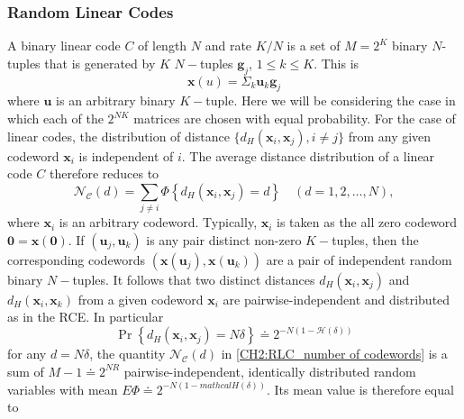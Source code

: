 \subsubsection{Random Linear Codes}
A binary linear code $C$ of length $N$ and rate $K/N$ is a set of $M=2^K$ binary $N$-tuples that is generated by $K$ $N-$tuples $\mathbf{g}_j$, $1\leq k \leq K$. This is
\begin{equation}
\mathbf{x}(u)=\Sigma_k \mathbf{u}_k \mathbf{g}_j
\end{equation}
where $\mathbf{u}$ is an arbitrary binary $K-$tuple. Here we will be considering the case in which each of the $2^{NK}$ matrices are chosen with equal probability. For the case of linear codes, the distribution of distance $\{d_H(\mathbf{x}_i,\mathbf{x}_j),i\neq j\}$ from any given codeword $\mathbf{x}_i$ is independent of $i$. The average distance distribution of a linear code $C$ therefore reduces to
\begin{equation}
\mathcal{N}_{\mathcal{C}}(d)=\sum_{j \neq i} \Phi\left\{d_{H}\left(\boldsymbol{x}_{i}, \boldsymbol{x}_{j}\right)=d\right\} \quad(d=1,2, \ldots, N),
\label{CH2:RLC_number of codewords}
\end{equation}
where $\mathbf{x}_i$ is an arbitrary codeword. Typically, $\mathbf{x}_i$ is taken as the all zero codeword $\mathbf{0}=\mathbf{x(0)}$. If $(\mathbf{u}_j,\mathbf{u}_k)$ is any pair distinct non-zero $K-$tuples, then the corresponding codewords $(\mathbf{x}(\mathbf{u}_j),\mathbf{x}(\mathbf{u}_k))$ are a pair of independent random binary $N-$tuples. It follows that two distinct distances $d_H(\mathbf{x}_i,\mathbf{x}_j)$ and $d_H(\mathbf{x}_i,\mathbf{x}_k)$ from a given codeword $\mathbf{x}_i$ are pairwise-independent and distributed as in the RCE. In particular 
\begin{equation}
\operatorname{Pr}\left\{d_{H}\left(\boldsymbol{x}_{i}, \boldsymbol{x}_{j}\right)=N \delta\right\} \doteq 2^{-N(1-\mathcal{H}(\delta))}
\end{equation}
for any $d=N\delta$, the quantity $\mathcal{N}_{\mathcal{C}}(d)$ in \eqref{CH2:RLC_number of codewords} is a sum of $M-1\doteq 2^{NR}$ pairwise-independent, identically distributed random variables with mean $E\Phi\doteq 2^{-N(1-mathcal{H}(\delta))}$. Its mean value is therefore equal to


